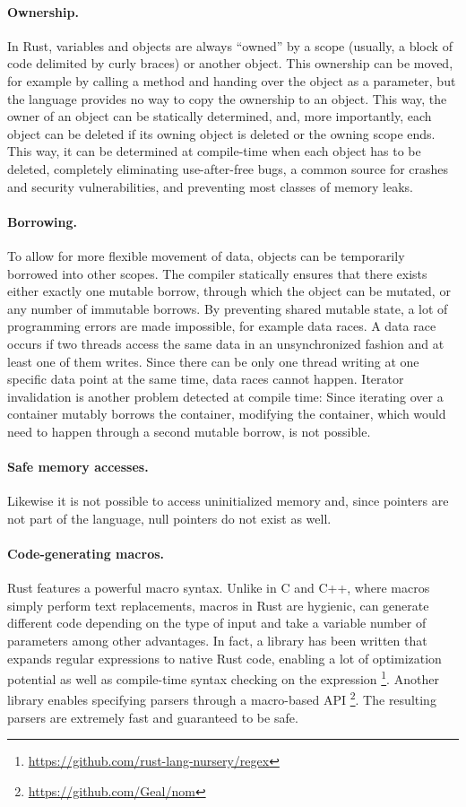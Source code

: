 \documentclass{scrartcl}
\begin{document}
\paragraph{Ownership.} In Rust, variables and objects are always "`owned"' by a scope (usually, a block of code delimited by curly braces) or another object. This ownership can be moved, for example by calling a method and handing over the object as a parameter, but the language provides no way to copy the ownership to an object. This way, the owner of an object can be statically determined, and, more importantly, each object can be deleted if its owning object is deleted or the owning scope ends. This way, it can be determined at compile-time when each object has to be deleted, completely eliminating use-after-free bugs, a common source for crashes and security vulnerabilities, and preventing most classes of memory leaks.

\paragraph{Borrowing.} To allow for more flexible movement of data, objects can be temporarily borrowed into other scopes. The compiler statically ensures that there exists either exactly one mutable borrow, through which the object can be mutated, or any number of immutable borrows. By preventing shared mutable state, a lot of programming errors are made impossible, for example data races. A data race occurs if two threads access the same data in an unsynchronized fashion and at least one of them writes. Since there can be only one thread writing at one specific data point at the same time, data races cannot happen. Iterator invalidation is another problem detected at compile time: Since iterating over a container mutably borrows the container, modifying the container, which would need to happen through a second mutable borrow, is not possible.

\paragraph{Safe memory accesses.} Likewise it is not possible to access uninitialized memory and, since pointers are not part of the language, null pointers do not exist as well.

\paragraph{Code-generating macros.} Rust features a powerful macro syntax. Unlike in C and C++, where macros simply perform text replacements, macros in Rust are hygienic, can generate different code depending on the type of input and take a variable number of parameters among other advantages. In fact, a library has been written that expands regular expressions to native Rust code, enabling a lot of optimization potential as well as compile-time syntax checking on the expression \footnote{\url{https://github.com/rust-lang-nursery/regex}}. Another library enables specifying parsers through a macro-based API \footnote{\url{https://github.com/Geal/nom}}. The resulting parsers are extremely fast and guaranteed to be safe.
\end{document}
